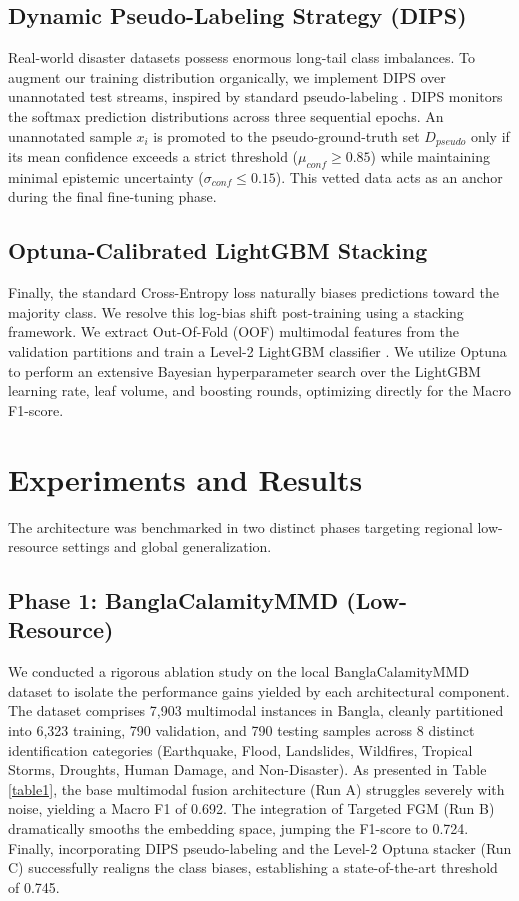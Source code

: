 \documentclass[twoside,twocolumn,10pt]{article}
\begin{document}
\subsection{Dynamic Pseudo-Labeling Strategy (DIPS)}
Real-world disaster datasets possess enormous long-tail class imbalances. To augment our training distribution organically, we implement DIPS over unannotated test streams, inspired by standard pseudo-labeling \cite{pseudo}. DIPS monitors the softmax prediction distributions across three sequential epochs. An unannotated sample $x_i$ is promoted to the pseudo-ground-truth set $D_{pseudo}$ only if its mean confidence exceeds a strict threshold ($\mu_{conf} \ge 0.85$) while maintaining minimal epistemic uncertainty ($\sigma_{conf} \le 0.15$). This vetted data acts as an anchor during the final fine-tuning phase.

\subsection{Optuna-Calibrated LightGBM Stacking}
Finally, the standard Cross-Entropy loss naturally biases predictions toward the majority class. We resolve this log-bias shift post-training using a stacking framework. We extract Out-Of-Fold (OOF) multimodal features from the validation partitions and train a Level-2 LightGBM classifier \cite{lightgbm}. We utilize Optuna \cite{optuna} to perform an extensive Bayesian hyperparameter search over the LightGBM learning rate, leaf volume, and boosting rounds, optimizing directly for the Macro F1-score.

\section{Experiments and Results}
\fontsize{11}{13}\selectfont

The architecture was benchmarked in two distinct phases targeting regional low-resource settings and global generalization.

\subsection{Phase 1: BanglaCalamityMMD (Low-Resource)}
We conducted a rigorous ablation study on the local BanglaCalamityMMD dataset to isolate the performance gains yielded by each architectural component. The dataset comprises 7,903 multimodal instances in Bangla, cleanly partitioned into 6,323 training, 790 validation, and 790 testing samples across 8 distinct identification categories (Earthquake, Flood, Landslides, Wildfires, Tropical Storms, Droughts, Human Damage, and Non-Disaster). As presented in Table \ref{table1}, the base multimodal fusion architecture (Run A) struggles severely with noise, yielding a Macro F1 of 0.692. The integration of Targeted FGM (Run B) dramatically smooths the embedding space, jumping the F1-score to 0.724. Finally, incorporating DIPS pseudo-labeling and the Level-2 Optuna stacker (Run C) successfully realigns the class biases, establishing a state-of-the-art threshold of 0.745.
\end{document}
